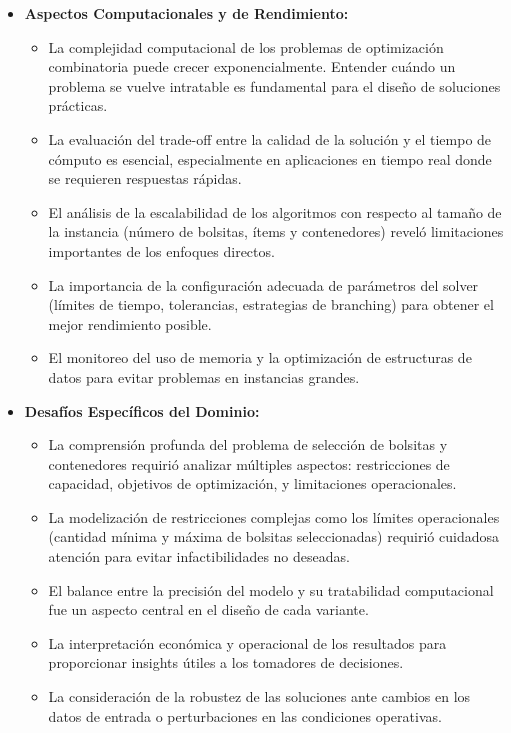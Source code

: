 \documentclass[a4paper,12pt]{article}
\begin{document}
\begin{itemize}
    \item \textbf{Aspectos Computacionales y de Rendimiento:}
    \begin{itemize}
        \item La complejidad computacional de los problemas de optimización combinatoria puede crecer exponencialmente. Entender cuándo un problema se vuelve intratable es fundamental para el diseño de soluciones prácticas.
        \item La evaluación del trade-off entre la calidad de la solución y el tiempo de cómputo es esencial, especialmente en aplicaciones en tiempo real donde se requieren respuestas rápidas.
        \item El análisis de la escalabilidad de los algoritmos con respecto al tamaño de la instancia (número de bolsitas, ítems y contenedores) reveló limitaciones importantes de los enfoques directos.
        \item La importancia de la configuración adecuada de parámetros del solver (límites de tiempo, tolerancias, estrategias de branching) para obtener el mejor rendimiento posible.
        \item El monitoreo del uso de memoria y la optimización de estructuras de datos para evitar problemas en instancias grandes.
    \end{itemize}
    
    \item \textbf{Desafíos Específicos del Dominio:}
    \begin{itemize}
        \item La comprensión profunda del problema de selección de bolsitas y contenedores requirió analizar múltiples aspectos: restricciones de capacidad, objetivos de optimización, y limitaciones operacionales.
        \item La modelización de restricciones complejas como los límites operacionales (cantidad mínima y máxima de bolsitas seleccionadas) requirió cuidadosa atención para evitar infactibilidades no deseadas.
        \item El balance entre la precisión del modelo y su tratabilidad computacional fue un aspecto central en el diseño de cada variante.
        \item La interpretación económica y operacional de los resultados para proporcionar insights útiles a los tomadores de decisiones.
        \item La consideración de la robustez de las soluciones ante cambios en los datos de entrada o perturbaciones en las condiciones operativas.
    \end{itemize}
    

\end{itemize}
\end{document}
